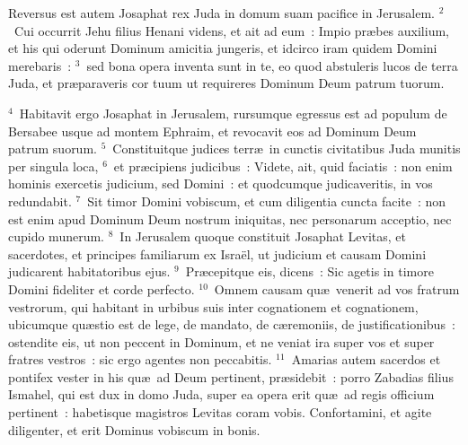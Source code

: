 \lettrine[lines=10,image=true,loversize=0.05,lraise=-0.03]{R}{}eversus est autem Josaphat rex Juda in domum suam pacifice in Jerusalem.
${}^{2}$~Cui occurrit Jehu filius Henani videns, et ait ad eum~: Impio pr\ae bes auxilium, et his qui oderunt Dominum amicitia jungeris, et idcirco iram quidem Domini merebaris~:
${}^{3}$~sed bona opera inventa sunt in te, eo quod abstuleris lucos de terra Juda, et pr\ae paraveris cor tuum ut requireres Dominum Deum patrum tuorum.


${}^{4}$~Habitavit ergo Josaphat in Jerusalem, rursumque egressus est ad populum de Bersabee usque ad montem Ephraim, et revocavit eos ad Dominum Deum patrum suorum.
${}^{5}$~Constituitque judices terr\ae\ in cunctis civitatibus Juda munitis per singula loca,
${}^{6}$~et pr\ae cipiens judicibus~: Videte, ait, quid faciatis~: non enim hominis exercetis judicium, sed Domini~: et quodcumque judicaveritis, in vos redundabit.
${}^{7}$~Sit timor Domini vobiscum, et cum diligentia cuncta facite~: non est enim apud Dominum Deum nostrum iniquitas, nec personarum acceptio, nec cupido munerum.
${}^{8}$~In Jerusalem quoque constituit Josaphat Levitas, et sacerdotes, et principes familiarum ex Isra\"el, ut judicium et causam Domini judicarent habitatoribus ejus.
${}^{9}$~Pr\ae cepitque eis, dicens~: Sic agetis in timore Domini fideliter et corde perfecto.
${}^{10}$~Omnem causam qu\ae\ venerit ad vos fratrum vestrorum, qui habitant in urbibus suis inter cognationem et cognationem, ubicumque qu\ae stio est de lege, de mandato, de c\ae remoniis, de justificationibus~: ostendite eis, ut non peccent in Dominum, et ne veniat ira super vos et super fratres vestros~: sic ergo agentes non peccabitis.
${}^{11}$~Amarias autem sacerdos et pontifex vester in his qu\ae\ ad Deum pertinent, pr\ae sidebit~: porro Zabadias filius Ismahel, qui est dux in domo Juda, super ea opera erit qu\ae\ ad regis officium pertinent~: habetisque magistros Levitas coram vobis. Confortamini, et agite diligenter, et erit Dominus vobiscum in bonis.

